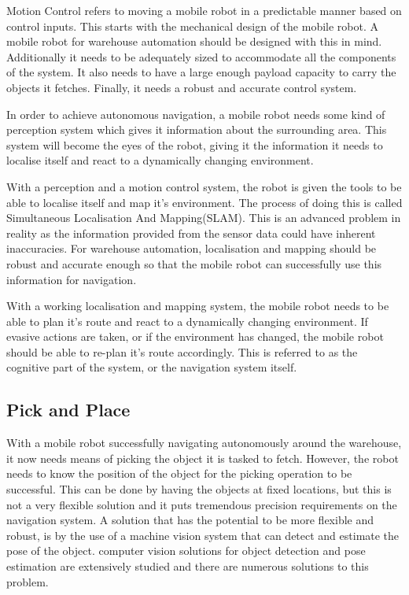 Motion Control refers to moving a mobile robot in a predictable manner based on control inputs. This starts with the mechanical design of the mobile robot. A mobile robot for warehouse automation should be designed with this in mind. Additionally it needs to be adequately sized to accommodate all the components of the system.  It also needs to have a large enough payload capacity to carry the objects it fetches. Finally, it needs a robust and accurate control system.

In order to achieve autonomous navigation, a mobile robot needs some kind of perception system which gives it information about the surrounding area. This system will become the eyes of the robot, giving it the information it needs to localise itself and react to a dynamically changing environment.

With a perception and a motion control system, the robot is given the tools to be able to localise itself and map it's environment. The process of doing this is called Simultaneous Localisation And Mapping(SLAM). This is an advanced problem in reality as the information provided from the sensor data could have inherent inaccuracies.  For warehouse automation, localisation and mapping should be robust and accurate enough so that the mobile robot can successfully use this information for navigation.

With a working localisation and mapping system, the mobile robot needs to be able to plan it's route and react to a dynamically changing environment. If evasive actions are taken, or if the environment has changed, the mobile robot should be able to re-plan it's route accordingly. This is referred to as the cognitive part of the system, or the navigation system itself.

\subsection{Pick and Place} \label{sec:I:PAP}
With a mobile robot successfully navigating autonomously around the warehouse, it now needs means of picking the object it is tasked to fetch. However, the robot needs to know the position of the object for the picking operation to be successful. This can be done by having the objects at fixed locations, but this is not a very flexible solution and it puts tremendous precision requirements on the navigation system. A solution that has the potential to be more flexible and robust, is by the use of a machine vision system that can detect and estimate the pose of the object. computer vision solutions for object detection and pose estimation are extensively studied and there are numerous solutions to this problem.

